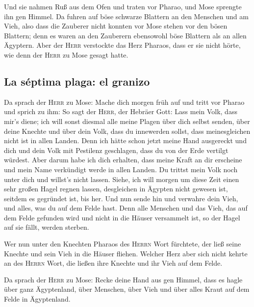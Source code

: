  Und sie nahmen Ruß aus dem Ofen und traten vor Pharao,
und Mose sprengte ihn gen Himmel. Da fuhren auf böse schwarze Blattern
an den Menschen und am Vieh,  also dass die Zauberer
nicht konnten vor Mose stehen vor den bösen Blattern; denn es waren an
den Zauberern ebensowohl böse Blattern als an allen Ägyptern.
 Aber der \textsc{Herr} verstockte das Herz Pharaos, dass
er sie nicht hörte, wie denn der \textsc{Herr} zu Mose gesagt hatte.

\hypertarget{la-suxe9ptima-plaga-el-granizo}{%
\subsection{La séptima plaga: el
granizo}\label{la-suxe9ptima-plaga-el-granizo}}

 Da sprach der \textsc{Herr} zu Mose: Mache dich morgen
früh auf und tritt vor Pharao und sprich zu ihm: So sagt der
\textsc{Herr}, der Hebräer Gott: Lass mein Volk, dass mir's diene;
 ich will sonst diesmal alle meine Plagen über dich
selbst senden, über deine Knechte und über dein Volk, dass du innewerden
sollst, dass meinesgleichen nicht ist in allen Landen. 
Denn ich hätte schon jetzt meine Hand ausgereckt und dich und dein Volk
mit Pestilenz geschlagen, dass du von der Erde vertilgt würdest.
 Aber darum habe ich dich erhalten, dass meine Kraft an
dir erscheine und mein Name verkündigt werde in allen Landen.
 Du trittst mein Volk noch unter dich und willst's nicht
lassen.  Siehe, ich will morgen um diese Zeit einen sehr
großen Hagel regnen lassen, desgleichen in Ägypten nicht gewesen ist,
seitdem es gegründet ist, bis her.  Und nun sende hin und
verwahre dein Vieh, und alles, was du auf dem Felde hast. Denn alle
Menschen und das Vieh, das auf dem Felde gefunden wird und nicht in die
Häuser versammelt ist, so der Hagel auf sie fällt, werden sterben.

 Wer nun unter den Knechten Pharaos des \textsc{Herrn}
Wort fürchtete, der ließ seine Knechte und sein Vieh in die Häuser
fliehen.  Welcher Herz aber sich nicht kehrte an des
\textsc{Herrn} Wort, die ließen ihre Knechte und ihr Vieh auf dem Felde.

 Da sprach der \textsc{Herr} zu Mose: Recke deine Hand
aus gen Himmel, dass es hagle über ganz Ägyptenland, über Menschen, über
Vieh und über alles Kraut auf dem Felde in Ägyptenland.

